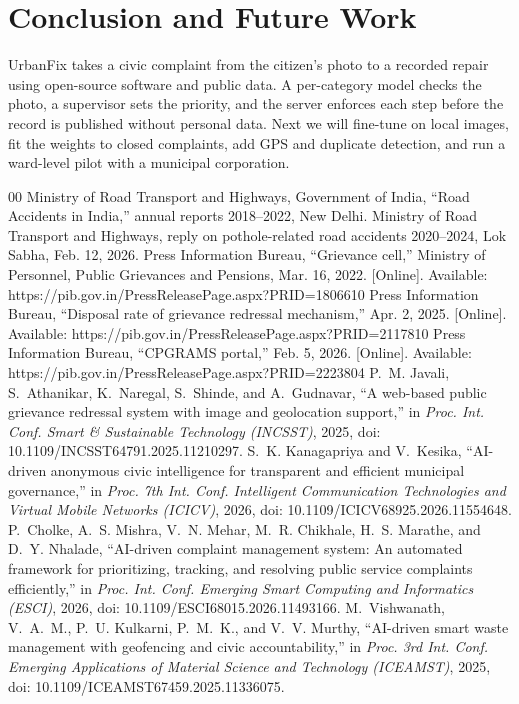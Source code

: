 \documentclass[conference]{IEEEtran}
\begin{document}
\section{Conclusion and Future Work}\label{sec:conc}
UrbanFix takes a civic complaint from the citizen's photo to a recorded repair using open-source software and public data. A per-category model checks the photo, a supervisor sets the priority, and the server enforces each step before the record is published without personal data. Next we will fine-tune on local images, fit the weights to closed complaints, add GPS and duplicate detection, and run a ward-level pilot with a municipal corporation.

\begin{thebibliography}{00}\footnotesize
{} Ministry of Road Transport and Highways, Government of India, ``Road Accidents in India,'' annual reports 2018--2022, New Delhi.
 Ministry of Road Transport and Highways, reply on pothole-related road accidents 2020--2024, Lok Sabha, Feb. 12, 2026.
 Press Information Bureau, ``Grievance cell,'' Ministry of Personnel, Public Grievances and Pensions, Mar. 16, 2022. [Online]. Available: https://pib.gov.in/PressReleasePage.aspx?PRID=1806610
 Press Information Bureau, ``Disposal rate of grievance redressal mechanism,'' Apr. 2, 2025. [Online]. Available: https://pib.gov.in/PressReleasePage.aspx?PRID=2117810
 Press Information Bureau, ``CPGRAMS portal,'' Feb. 5, 2026. [Online]. Available: https://pib.gov.in/PressReleasePage.aspx?PRID=2223804
 P.~M. Javali, S.~Athanikar, K.~Naregal, S.~Shinde, and A.~Gudnavar, ``A web-based public grievance redressal system with image and geolocation support,'' in \textit{Proc. Int. Conf. Smart \& Sustainable Technology (INCSST)}, 2025, doi: 10.1109/INCSST64791.2025.11210297.
 S.~K. Kanagapriya and V.~Kesika, ``AI-driven anonymous civic intelligence for transparent and efficient municipal governance,'' in \textit{Proc. 7th Int. Conf. Intelligent Communication Technologies and Virtual Mobile Networks (ICICV)}, 2026, doi: 10.1109/ICICV68925.2026.11554648.
 P.~Cholke, A.~S. Mishra, V.~N. Mehar, M.~R. Chikhale, H.~S. Marathe, and D.~Y. Nhalade, ``AI-driven complaint management system: An automated framework for prioritizing, tracking, and resolving public service complaints efficiently,'' in \textit{Proc. Int. Conf. Emerging Smart Computing and Informatics (ESCI)}, 2026, doi: 10.1109/ESCI68015.2026.11493166.
 M.~Vishwanath, V.~A.~M., P.~U. Kulkarni, P.~M.~K., and V.~V. Murthy, ``AI-driven smart waste management with geofencing and civic accountability,'' in \textit{Proc. 3rd Int. Conf. Emerging Applications of Material Science and Technology (ICEAMST)}, 2025, doi: 10.1109/ICEAMST67459.2025.11336075.

\end{thebibliography}
\end{document}
